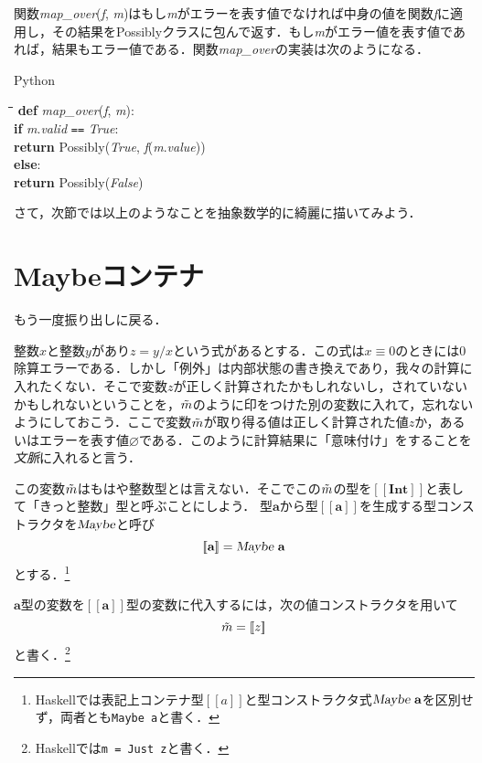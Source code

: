 \documentclass[twocolumn]{jsbook}
\def\[{\left[\!\left[}
\def\]{\right]\!\right]}
\newcommand{\programminglanguage}[1]{\textsf{#1}}
\newcommand{\haskell}{\programminglanguage{Haskell}}
\newcommand{\python}{\programminglanguage{Python}}
\newcommand{\code}[1]{\texttt{#1}}
\newcommand{\keyword}[1]{{\emph{#1}}}
\newenvironment{pythoncode}{\begin{itembox}[r]{\python}}{\end{itembox}}
\newenvironment{pythontab}{\begin{tabbing}\hspace*{1em}\=\hspace*{1em}\=\hspace*{1em}\=\hspace*{1em}\=\kill}{\end{tabbing}}
\newcommand{\pthnClassname}[1]{\textrm{#1}}
\newcommand{\pthnId}[1]{\textit{#1}}
\newcommand{\pthnKeyword}[1]{\textbf{#1}}
\newcommand{\pthnOp}[1]{\texttt{#1}}
\newcommand{\hsklType}[1]{\textbf{#1}}
\newcommand{\hsklTypeConstructor}[1]{\textsl{#1}}
\DeclareMathOperator{\hsklMaybeConstructor}{\hsklTypeConstructor{Maybe}}
\newcommand{\hsklNothing}{\varnothing}
\newcommand{\hsklInt}{\hsklType{Int}}
\newcommand{\hsklJust}[1]{\[#1\]}
\newcommand{\hsklMaybeType}[1]{\[#1\]}
\newcommand{\hsklTypeConstruct}[2]{#1\,#2}
\newcommand{\hsklMaybe}[1]{\Tilde{#1}}
\begin{document}
関数\pthnId{map\_over}(\pthnId{f}, \pthnId{m})はもし\pthnId{m}がエラーを表す値でなければ中身の値を関数\pthnId{f}に適用し，その結果を\pthnClassname{Possibly}クラスに包んで返す．もし\pthnId{m}がエラー値を表す値であれば，結果もエラー値である．関数\pthnId{map\_over}の実装は次のようになる．
\begin{pythoncode}
\begin{pythontab}
\pthnKeyword{def} \pthnId{map\_over}(\pthnId{f}, \pthnId{m}):\\
\>\pthnKeyword{if} \pthnId{m}.\pthnId{valid} \pthnOp{==} \pthnId{True}:\\
\>\>\pthnKeyword{return} \pthnClassname{Possibly}(\pthnId{True}, \pthnId{f}(\pthnId{m}.\pthnId{value}))\\
\>\pthnKeyword{else}:\\
\>\>\pthnKeyword{return} \pthnClassname{Possibly}(\pthnId{False})
\end{pythontab}
\end{pythoncode}

さて，次節では以上のようなことを抽象数学的に綺麗に描いてみよう．

\section{Maybeコンテナ}

もう一度振り出しに戻る．

整数$x$と整数$y$があり$z=y/x$という式があるとする．この式は$x\equiv0$のときには$0$除算エラーである．しかし「例外」は内部状態の書き換えであり，我々の計算に入れたくない．そこで変数$z$が正しく計算されたかもしれないし，されていないかもしれないということを，$\hsklMaybe{m}$のように印をつけた別の変数に入れて，忘れないようにしておこう．ここで変数$\hsklMaybe{m}$が取り得る値は正しく計算された値$z$か，あるいはエラーを表す値$\hsklNothing$である．このように計算結果に「意味付け」をすることを\keyword{文脈}に入れると言う．

この変数$\hsklMaybe{m}$はもはや整数型とは言えない．そこでこの$\hsklMaybe{m}$の型を$\hsklMaybeType{\hsklInt}$と表して「きっと整数」型と呼ぶことにしよう．
型$\hsklType{a}$から型$\hsklMaybeType{\hsklType{a}}$を生成する型コンストラクタを$\hsklMaybeConstructor$と呼び$$\hsklMaybeType{\hsklType{a}}=\hsklTypeConstruct{\hsklMaybeConstructor}{\hsklType{a}}$$とする．\footnote{\haskell では表記上コンテナ型$\hsklMaybeType{a}$と型コンストラクタ式$\hsklTypeConstruct{\hsklMaybeConstructor}{\hsklType{a}}$を区別せず，両者とも\code{Maybe a}と書く．}

$\hsklType{a}$型の変数を$\hsklMaybeType{\hsklType{a}}$型の変数に代入するには，次の値コンストラクタを用いて$$\hsklMaybe{m}=\hsklJust{z}$$と書く．\footnote{\haskell では\code{m = Just z}と書く．}
\end{document}
